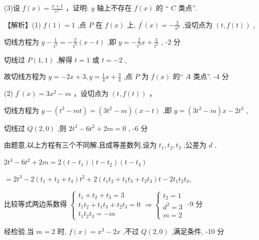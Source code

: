 \documentclass[10pt]{article}
\begin{document}
(3)设 \(f\left( x\right)  = \frac{x + 1}{{e}^{x}}\) ，证明: \(y\) 轴上不存在 \(f\left( x\right)\) 的 “ \(C\) 类点”.

【解析】(1) \(f\left( 1\right)  = 1\) ,点 \(P\) 在 \(f\left( x\right)\) 上, \({f}^{\prime }\left( x\right)  =  - \frac{2}{{x}^{3}}\) ,设切点为 \(\left( {t,f\left( t\right) }\right)\) ,

切线方程为 \(y - \frac{1}{{t}^{2}} =  - \frac{2}{{t}^{3}}\left( {x - t}\right)\) ,即 \(y =  - \frac{2}{{t}^{3}}x + \frac{3}{{t}^{2}}\) , -2 分

切线过 \(P\left( {1,1}\right)\) ,解得 \(t = 1\) 或 \(t =  - 2\) ,

故切线方程为 \(y =  - {2x} + 3,y = \frac{1}{4}x + \frac{3}{4}\) ,点 \(P\) 为 \(f\left( x\right)\) 的“ \(A\) 类点”. -4 分

(2) \({f}^{\prime }\left( x\right)  = 3{x}^{2} - m\) ，设切点为 \(\left( {t,f\left( t\right) }\right)\) ，

切线方程为 \(y - \left( {{t}^{3} - {mt}}\right)  = \left( {3{t}^{2} - m}\right) \left( {x - t}\right)\) ,即 \(y = \left( {3{t}^{2} - m}\right) x - 2{t}^{3}\) ,

切线过 \(Q\left( {2,0}\right)\) ,则 \(2{t}^{3} - 6{t}^{2} + {2m} = 0\) , -6 分

由题意,以上方程有三个不同解,且成等差数列,设为 \({t}_{1},{t}_{2},{t}_{3}\) ,公差为 \(d\) ,

\(2{t}^{3} - 6{t}^{2} + {2m} = 2\left( {t - {t}_{1}}\right) \left( {t - {t}_{2}}\right) \left( {t - {t}_{3}}\right)\)

\(= 2{t}^{3} - 2\left( {{t}_{1} + {t}_{2} + {t}_{3}}\right) {t}^{2} + 2\left( {{t}_{1}{t}_{2} + {t}_{1}{t}_{3} + {t}_{2}{t}_{3}}\right) t - 2{t}_{1}{t}_{2}{t}_{3},\)

比较等式两边系数得 \(\left\{  \begin{array}{l} {t}_{1} + {t}_{2} + {t}_{3} = 3 \\  {t}_{1}{t}_{2} + {t}_{1}{t}_{3} + {t}_{2}{t}_{3} = 0 \\  {t}_{1}{t}_{2}{t}_{3} =  - m \end{array}\right.  \Rightarrow  \left\{  \begin{array}{l} {t}_{2} = 1 \\  {d}^{2} = 3 \\  m = 2 \end{array}\right.\) -9 分

经检验,当 \(m = 2\) 时, \(f\left( x\right)  = {x}^{3} - {2x}\) ,不过 \(Q\left( {2,0}\right)\) ,满足条件, -10 分
\end{document}
